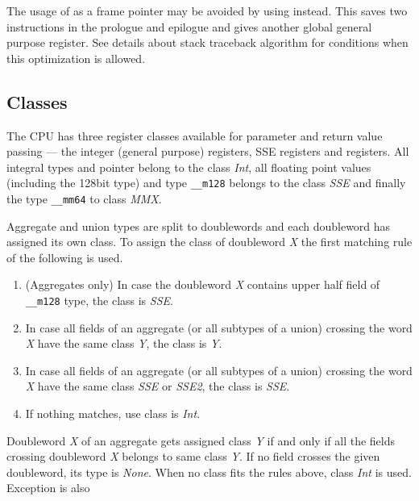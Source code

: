 The usage of \RBP{} as a frame pointer may be avoided by using \RSP{}
instead.  This saves two instructions in the prologue and epilogue and
gives another global general purpose register.  See details about
stack traceback algorithm for conditions when this optimization is
allowed.  

\subsection{Classes}

The \xARCH CPU has three register classes available for parameter and
return value passing --- the integer (general purpose) registers, SSE
registers and \MMX{} registers.  All integral types and pointer belong
to the class \emph{Int}, all floating point values (including the
128bit type) and type \verb|__m128| belongs to the class \emph{SSE}
and finally the type \verb|__mm64| to class \emph{MMX}.

Aggregate and union types are split to doublewords and each doubleword has
assigned its own class. To assign the class of doubleword \emph{X} the
first matching rule of the following is used.
\begin{enumerate}
  \item (Aggregates only) In case the doubleword \emph{X} contains upper half field of
    \verb|__m128| type, the class is \emph{SSE}.
    
  \item In case all fields of an aggregate (or all subtypes of a
    union) crossing the word \emph{X} have the same class \emph{Y},
    the class is \emph{Y}.
    
  \item In case all fields of an aggregate (or all subtypes of a
    union) crossing the word \emph{X} have the same class \emph{SSE}
    or \emph{SSE2}, the class is \emph{SSE}.

  \item If nothing matches, use class is \emph{Int}.
\end{enumerate}

Doubleword \emph{X} of an aggregate gets assigned class \emph{Y} if and only
if all the fields crossing doubleword \emph{X} belongs to same class \emph{Y}.  If
no field crosses the given doubleword, its type is \emph{None}. When no class fits
the rules above, class \emph{Int} is used.  Exception is also 

